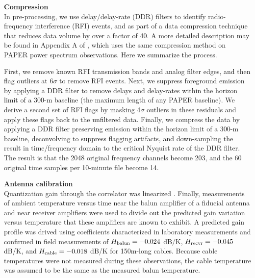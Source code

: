 \documentclass[preprint]{aastex}
\begin{document}
\textbf{Compression}\\

In pre-processing, we use delay/delay-rate (DDR) filters
\citep{Parsons:2009p7859} to identify radio-frequency interference (RFI)
events, and as part of a data compression technique that reduces data volume by
over a factor of 40.  A more detailed description may be found in Appendix A of
\cite{Parsons2013b}, which uses the same compression method on PAPER power
spectrum observations. Here we summarize the process.

First, we remove known RFI transmission bands and analog filter edges, and then
flag outliers at 6$\sigma$ to remove RFI events.  Next, we suppress foreground
emission by applying a DDR filter to remove delays and delay-rates within the
horizon limit of a 300-m baseline (the maximum length of any PAPER baseline).
We derive a second set of RFI flags by masking 4$\sigma$ outliers in these
residuals and apply these flags back to the unfiltered data.  Finally, we
compress the data by applying a DDR filter preserving emission within the
horizon limit of a 300-m baseline, deconvolving to suppress flagging artifacts,
and down-sampling the result in time/frequency domain to the critical Nyquist
rate of the DDR filter.  The result is that the 2048 original frequency
channels become 203, and the 60 original time samples per 10-minute file become
14. 



\textbf{Antenna calibration}\\

Quantization gain through the correlator was linearized \citep{parsons_et_al2008}.
Finally, measurements of ambient temperature versus time near the balun amplifier of a fiducial antenna and near
receiver amplifiers were used to divide out the predicted gain variation versus temperature that these amplifiers
are known to exhibit.  A predicted gain profile was drived using coefficients characterized in
laboratory measurements \citep{parashare_bradley2009} and
confirmed in field measurements \citep{pober_et_al2011} of $H_{\rm balun}=-0.024$ dB/K, $H_{\rm recvr}=-0.045$
dB/K, and $H_{\rm cable}=-0.018$ dB/K for 150m-long cables.  Because cable temperatures were not measured
during these observations, the cable temperature was assumed to be the same as the measured balun temperature.
\end{document}

